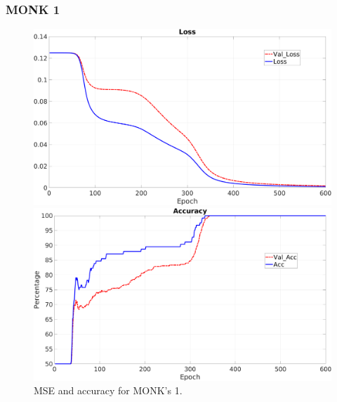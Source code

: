 \subsubsection{MONK 1}

\begin{figure}[H]
    \centering
    \begin{minipage}[t]{0.5\linewidth}
        \includegraphics[width=\linewidth]{img/Monk1_loss.png}
    \end{minipage}%
    \begin{minipage}[t]{0.5\linewidth}
        \includegraphics[width=\linewidth]{img/Monk1_accuracy.png}
    \end{minipage}
    \caption{MSE and accuracy for MONK’s 1.}
\end{figure}

